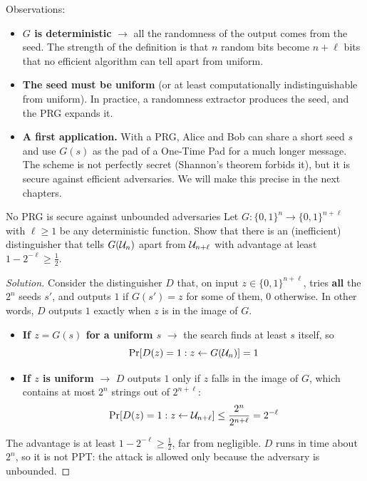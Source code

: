 Observations:
\begin{itemize}
  \item \textbf{$G$ is deterministic} $\to$ all the randomness of the output comes from the seed. The strength of the definition is that $n$ random bits become $n + \ell$ bits that no efficient algorithm can tell apart from uniform.
  \item \textbf{The seed must be uniform} (or at least computationally indistinguishable from uniform). In practice, a randomness extractor produces the seed, and the PRG expands it.
  \item \textbf{A first application.} With a PRG, Alice and Bob can share a short seed $s$ and use $G(s)$ as the pad of a One-Time Pad for a much longer message. The scheme is not perfectly secret (Shannon's theorem forbids it), but it is secure against efficient adversaries. We will make this precise in the next chapters.
\end{itemize}

\begin{framedprob}[label={prob:prg-unbounded}]{No PRG is secure against unbounded adversaries}
  Let $G : \{0,1\}^n \to \{0,1\}^{n+\ell}$ with $\ell \geq 1$ be any deterministic function. Show that there is an (inefficient) distinguisher that tells $G(\mathcal{U}_{n})$ apart from $\mathcal{U}_{n+\ell}$ with advantage at least $1 - 2^{-\ell} \geq \frac{1}{2}$.
\end{framedprob}

\begin{proof}[Solution]
  Consider the distinguisher $D$ that, on input $z \in \{0,1\}^{n+\ell}$, tries \textbf{all} the $2^n$ seeds $s'$, and outputs $1$ if $G(s') = z$ for some of them, $0$ otherwise. In other words, $D$ outputs $1$ exactly when $z$ is in the image of $G$.
  \begin{itemize}
    \item \textbf{If $z = G(s)$ for a uniform $s$} $\to$ the search finds at least $s$ itself, so
    \[
      \Pr[D(z) = 1 : z \leftarrow G(\mathcal{U}_{n})] = 1
    \]
    \item \textbf{If $z$ is uniform} $\to$ $D$ outputs $1$ only if $z$ falls in the image of $G$, which contains at most $2^n$ strings out of $2^{n+\ell}$:
    \[
      \Pr[D(z) = 1 : z \leftarrow \mathcal{U}_{n+\ell}] \leq \frac{2^n}{2^{n+\ell}} = 2^{-\ell}
    \]
  \end{itemize}
  The advantage is at least $1 - 2^{-\ell} \geq \frac{1}{2}$, far from negligible. $D$ runs in time about $2^n$, so it is not PPT: the attack is allowed only because the adversary is unbounded.
\end{proof}

